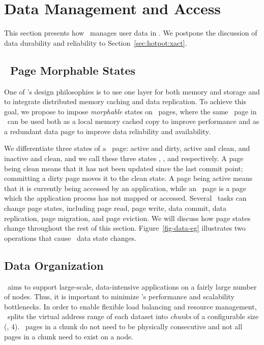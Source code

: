 \section{Data Management and Access}
\label{sec:hotpot:data}

This section presents how \hotpot\ manages user data in \dsnvm. 
We postpone the discussion of data durability and reliability to Section~\ref{sec:hotpot:xact}.



\subsection{\nvm\ Page Morphable States}
One of \hotpot's design philosophies is to use one layer for both memory and storage 
and to integrate distributed memory caching and data replication.
To achieve this goal, we propose to impose {\em morphable} states on \nvm\ pages,
where the same \nvm\ page in \hotpot\ can be used both as a local memory cached copy to improve performance
and as a redundant data page to improve data reliability and availability.

We differentiate three states of a \nvm\ page:
active and dirty, active and clean, and inactive and clean,
and we call these three states {\em \dirty}, {\em \committed}, and {\em \redundant} respectively.
A page being clean means that it has not been updated since the last commit point;
committing a dirty page moves it to the clean state.
A page being active means that it is currently being accessed by an application,
while an \redundant\ page is a page which the application process has not mapped or accessed.
Several \hotpot\ tasks can change page states,
including page read, page write, data commit, data replication, page migration, and page eviction.
We will discuss how page states change throughout the rest of this section.
Figure~\ref{fig-data-eg} illustrates two operations that cause \hotpot\ data state changes.

\subsection{Data Organization}
\hotpot\ aims to support large-scale, data-intensive applications
on a fairly large number of nodes. %
Thus, it is important to minimize \hotpot's performance and scalability bottlenecks.
In order to enable flexible load balancing and resource management,
\hotpot\ splits the virtual address range of each dataset 
into {\em chunks} of a configurable size (\eg, 4\MB).
\nvm\ pages in a chunk do not need to be physically consecutive
and not all pages in a chunk need to exist on a node.

